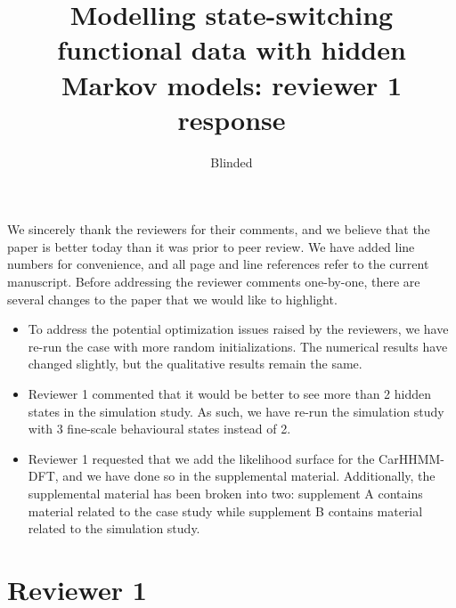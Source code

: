 \documentclass{article}
\begin{document}
\title{Modelling state-switching functional data with hidden Markov models: reviewer 1 response}
\date{}
\author{Blinded}

\maketitle

We sincerely thank the reviewers for their comments, and we believe that the paper is better today than it was prior to peer review. We have added line numbers for convenience, and all page and line references refer to the current manuscript. Before addressing the reviewer comments one-by-one, there are several changes to the paper that we would like to highlight.

\begin{itemize}
    \item To address the potential optimization issues raised by the reviewers, we have re-run the case with more random initializations. The numerical results have changed slightly, but the qualitative results remain the same.
    \item Reviewer 1 commented that it would be better to see more than 2 hidden states in the simulation study. As such, we have re-run the simulation study with 3 fine-scale behavioural states instead of 2.
    \item Reviewer 1 requested that we add the likelihood surface for the CarHHMM-DFT, and we have done so in the supplemental material. Additionally, the supplemental material has been broken into two: supplement A contains material related to the case study while supplement B contains material related to the simulation study. 
\end{itemize}


\section*{Reviewer 1}
\end{document}
